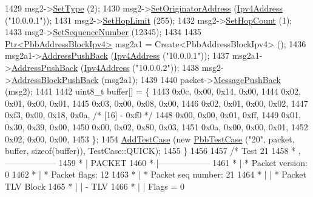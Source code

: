 \begin{DoxyCode}
1429     msg2->\hyperlink{classns3_1_1PbbMessage_a4b3d1eaabd3e7412a46ac79bf3360dac}{SetType} (2);
1430     msg2->\hyperlink{classns3_1_1PbbMessage_a52ac135a2bec53db5e8f46b8b8a25e7c}{SetOriginatorAddress} (\hyperlink{classns3_1_1Ipv4Address}{Ipv4Address} (\textcolor{stringliteral}{"10.0.0.1"}));
1431     msg2->\hyperlink{classns3_1_1PbbMessage_a532a7e5e135f7491f8a84ab1dfadd28f}{SetHopLimit} (255);
1432     msg2->\hyperlink{classns3_1_1PbbMessage_a882ec7e2e9a9dff6297152c196d54ce4}{SetHopCount} (1);
1433     msg2->\hyperlink{classns3_1_1PbbMessage_a8c24696ac67507afa03c9750daccc47d}{SetSequenceNumber} (12345);
1434 
1435     \hyperlink{classns3_1_1Ptr}{Ptr<PbbAddressBlockIpv4>} msg2a1 = Create<PbbAddressBlockIpv4> ();
1436     msg2a1->\hyperlink{classns3_1_1PbbAddressBlock_a7be545a53d69bd426dbebcf752ed8371}{AddressPushBack} (\hyperlink{classns3_1_1Ipv4Address}{Ipv4Address} (\textcolor{stringliteral}{"10.0.0.1"}));
1437     msg2a1->\hyperlink{classns3_1_1PbbAddressBlock_a7be545a53d69bd426dbebcf752ed8371}{AddressPushBack} (\hyperlink{classns3_1_1Ipv4Address}{Ipv4Address} (\textcolor{stringliteral}{"10.0.0.2"}));
1438     msg2->\hyperlink{classns3_1_1PbbMessage_a5f623bad2fb1adde7da885e1c92d5311}{AddressBlockPushBack} (msg2a1);
1439 
1440     packet->\hyperlink{classns3_1_1PbbPacket_a4a3170001ef758d9c9c4375b8f089826}{MessagePushBack} (msg2);
1441 
1442     uint8\_t buffer[] = \{
1443       0x0c, 0x00, 0x14, 0x00,
1444       0x02, 0x01, 0x00, 0x01,
1445       0x03, 0x00, 0x08, 0x00,
1446       0x02, 0x01, 0x00, 0x02,
1447       0xf3, 0x00, 0x18, 0x0a,   \textcolor{comment}{/* [16] - 0xf0 */}
1448       0x00, 0x00, 0x01, 0xff,
1449       0x01, 0x30, 0x39, 0x00,
1450       0x00, 0x02, 0x80, 0x03,
1451       0x0a, 0x00, 0x00, 0x01,
1452       0x02, 0x00, 0x00,
1453     \};
1454     \hyperlink{classns3_1_1TestCase_a3718088e3eefd5d6454569d2e0ddd835}{AddTestCase} (\textcolor{keyword}{new} \hyperlink{classPbbTestCase}{PbbTestCase} (\textcolor{stringliteral}{"20"}, packet, buffer, \textcolor{keyword}{sizeof}(buffer)), 
      TestCase::QUICK);
1455   \}
1456 
1457   \textcolor{comment}{/* Test 21}
1458 \textcolor{comment}{         * ,------------------}
1459 \textcolor{comment}{         * |  PACKET}
1460 \textcolor{comment}{         * |------------------}
1461 \textcolor{comment}{         * | * Packet version:    0}
1462 \textcolor{comment}{         * | * Packet flags:  12}
1463 \textcolor{comment}{         * | * Packet seq number: 21}
1464 \textcolor{comment}{         * |    | * Packet TLV Block}
1465 \textcolor{comment}{         * |    |     - TLV}
1466 \textcolor{comment}{         * |    |         Flags = 0}

\end{DoxyCode}
